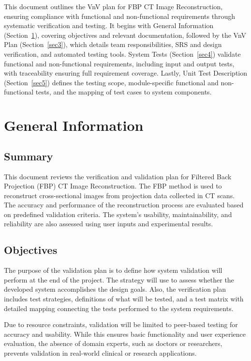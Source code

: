 \documentclass[12pt, titlepage]{article}
\begin{document}
\newpage


This document outlines the VnV plan for FBP CT Image Reconstruction, ensuring compliance with
functional and non-functional requirements through systematic verification and
testing. It begins with General Information (Section~\ref{sec2}), covering objectives and
relevant documentation, followed by the VnV Plan (Section~\ref{sec3}), which details team
responsibilities, SRS and design verification, and automated testing tools.
System Tests (Section~\ref{sec4}) validate functional and non-functional requirements,
including input and output tests, with traceability ensuring full requirement
coverage. Lastly, Unit Test Description (Section~\ref{sec5}) defines the testing scope,
module-specific functional and non-functional tests, and the mapping of test
cases to system components.

\section{General Information} \label{sec2}

\subsection{Summary}
This document reviews the verification and validation plan for Filtered Back
Projection (FBP) CT Image Reconstruction. The FBP method is used to reconstruct
cross-sectional images from projection data collected in CT scans. The accuracy
and performance of the reconstruction process are evaluated based on predefined
validation criteria. The system’s usability, maintainability, and reliability
are also assessed using user inputs and experimental results.

\subsection{Objectives}
The purpose of the validation plan is to define how system validation will
perform at the end of the project. The strategy will use to assess whether the
developed system accomplishes the design goals. Also, the verification plan
includes test strategies, definitions of what will be tested, and a test matrix
with detailed mapping connecting the tests performed to the system
requirements.

Due to resource constraints, validation will be limited to
peer-based testing for accuracy and usability. While this ensures basic
functionality and user experience evaluation, the absence of domain experts,
such as doctors or researchers, prevents validation in real-world clinical or
research applications.
\end{document}
